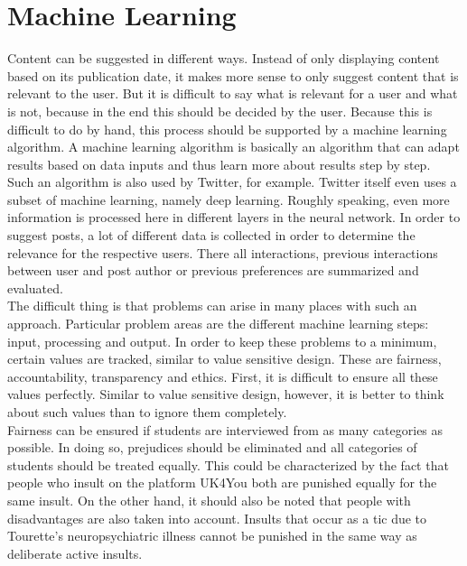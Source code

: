 \section{Machine Learning}\label{sec:ai}
Content can be suggested in different ways.
Instead of only displaying content based on its publication date, it makes more sense to only suggest content that is relevant to the user.
But it is difficult to say what is relevant for a user and what is not, because in the end this should be decided by the user.
Because this is difficult to do by hand, this process should be supported by a machine learning algorithm.
A machine learning algorithm is basically an algorithm that can adapt results based on data inputs and thus learn more about results step by step.\\

Such an algorithm is also used by Twitter, for example\cite{twitter-deep-learning}.
Twitter itself even uses a subset of machine learning, namely deep learning.
Roughly speaking, even more information is processed here in different layers in the neural network.
In order to suggest posts, a lot of different data is collected in order to determine the relevance for the respective users.
There all interactions, previous interactions between user and post author or previous preferences are summarized and evaluated.\\

The difficult thing is that problems can arise in many places with such an approach.
Particular problem areas are the different machine learning steps: input, processing and output.
In order to keep these problems to a minimum, certain values are tracked, similar to value sensitive design.
These are fairness, accountability, transparency and ethics.
First, it is difficult to ensure all these values perfectly.
Similar to value sensitive design, however, it is better to think about such values than to ignore them completely.\\

Fairness can be ensured if students are interviewed from as many categories as possible.
In doing so, prejudices should be eliminated and all categories of students should be treated equally\cite{fairness-framework}.
This could be characterized by the fact that people who insult on the platform UK4You both are punished equally for the same insult.
On the other hand, it should also be noted that people with disadvantages are also taken into account.
Insults that occur as a tic due to Tourette's neuropsychiatric illness cannot be punished in the same way as deliberate active insults.\\

